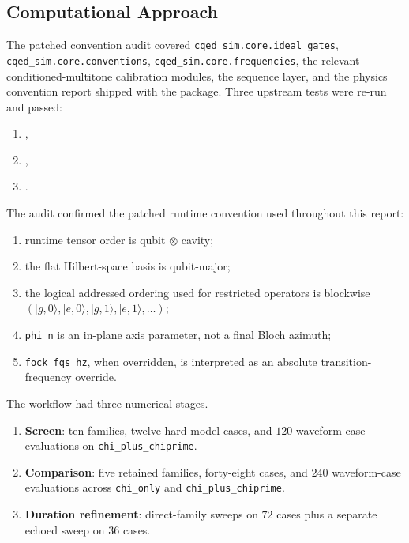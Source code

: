 \documentclass[aps,pra,twocolumn,reprint,floatfix,amsmath,amssymb]{revtex4-2}
\begin{document}
\subsection{Computational Approach}
The patched convention audit covered \texttt{cqed\_sim.core.ideal\_gates}, \texttt{cqed\_sim.core.conventions}, \texttt{cqed\_sim.core.frequencies}, the relevant conditioned-multitone calibration modules, the sequence layer, and the physics convention report shipped with the package. Three upstream tests were re-run and passed:
\begin{enumerate}
    \item {},
    \item {},
    \item {}.
\end{enumerate}
The audit confirmed the patched runtime convention used throughout this report:
\begin{enumerate}
    \item runtime tensor order is qubit $\otimes$ cavity;
    \item the flat Hilbert-space basis is qubit-major;
    \item the logical addressed ordering used for restricted operators is blockwise $(|g,0\rangle,|e,0\rangle,|g,1\rangle,|e,1\rangle,\ldots)$;
    \item \texttt{phi\_n} is an in-plane axis parameter, not a final Bloch azimuth;
    \item \texttt{fock\_fqs\_hz}, when overridden, is interpreted as an absolute transition-frequency override.
\end{enumerate}

The workflow had three numerical stages.
\begin{enumerate}
    \item \textbf{Screen}: ten families, twelve hard-model cases, and $120$ waveform-case evaluations on \texttt{chi\_plus\_chiprime}.
    \item \textbf{Comparison}: five retained families, forty-eight cases, and $240$ waveform-case evaluations across \texttt{chi\_only} and \texttt{chi\_plus\_chiprime}.
    \item \textbf{Duration refinement}: direct-family sweeps on $72$ cases plus a separate echoed sweep on $36$ cases.
\end{enumerate}
\end{document}

